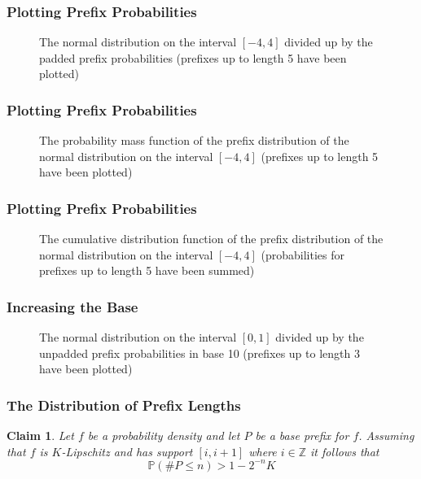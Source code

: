 \documentclass{beamer}
\newcommand{\pr}[2]{\underset{#1}{\mathbb{P}}\left(#2\right)}
\newtheorem{claim}{Claim}
\begin{document}
\begin{frame}
\frametitle{Plotting Prefix Probabilities}
\begin{figure}
    \scalebox{0.77}{}
    \caption{The normal distribution on the interval $[-4,4]$ divided up by the padded prefix probabilities (prefixes up to length 5 have been plotted)}
    \label{fig:normal_bin_cover_full}
\end{figure}
\end{frame}

\begin{frame}
\frametitle{Plotting Prefix Probabilities}
\begin{figure}
    \centering
    \scalebox{0.77}{}
    \caption{The probability mass function of the prefix distribution of the normal distribution on the interval $[-4,4]$ (prefixes up to length 5 have been plotted)}
    \label{fig:normal_bin_pmf_full}\vspace{2em}
\end{figure}
\end{frame}

\begin{frame}
\frametitle{Plotting Prefix Probabilities}
\begin{figure}
    \scalebox{0.77}{}
    \caption{The cumulative distribution function of the prefix distribution of the normal distribution on the interval $[-4,4]$ (probabilities for prefixes up to length 5 have been summed)}
    \label{fig:normal_bin_cdf_full}
\end{figure}
\end{frame}

\begin{frame}
\frametitle{Increasing the Base}
\begin{figure}
	\scalebox{0.77}{}
	\caption{The normal distribution on the interval $[0,1]$ divided up by the unpadded prefix probabilities in base 10 (prefixes up to length 3 have been plotted)}
	\label{fig:normal_dec_cover}\vspace{2em}
\end{figure}
\end{frame}

\begin{frame}
\frametitle{The Distribution of Prefix Lengths}
\begin{claim}\label{a}
	Let $f$ be a probability density and let $P$ be a base prefix for $f$. Assuming that $f$ is $K$-Lipschitz and has support $[i,i+1]$ where $i\in\mathbb{Z}$ it follows that  
	\[
	\pr{}{\#P \leq n} >1-2^{-n}K
	\]
\end{claim}
\end{frame}
\end{document}
